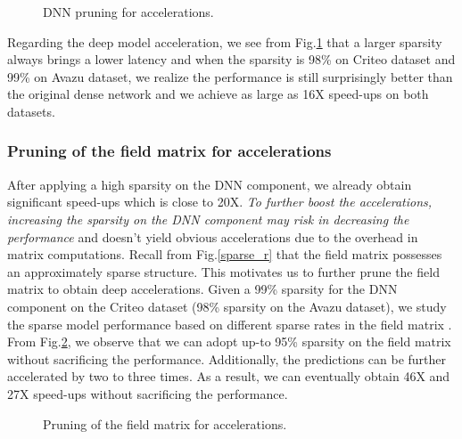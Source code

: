 \documentclass[sigconf]{acmart}
\begin{document}
\begin{figure}[h!]
\centering
\vspace{-0.1in}
  \vspace{-0.1in}
  \caption{DNN pruning for accelerations.}
  \label{prune_fig_dnns}
\end{figure}


Regarding the deep model acceleration, we see from Fig.\ref{prune_fig_dnns} that a larger sparsity always brings a lower latency and when the sparsity is 98\% on Criteo dataset and 99\% on Avazu dataset, we realize the performance is still surprisingly better than the original dense network and we achieve as large as 16X speed-ups on both datasets. 






\subsubsection{\textbf{Pruning of the field matrix }\textbf{ for accelerations}}

After applying a high sparsity on the DNN component, we already obtain significant speed-ups which is close to 20X. \emph{To further boost the accelerations, increasing the sparsity on the DNN component may risk in decreasing the performance} and doesn't yield obvious accelerations due to the overhead in matrix computations. Recall from Fig.\ref{sparse_r} that the field matrix  possesses an approximately sparse structure. This motivates us to further prune the field matrix  to obtain deep accelerations. Given a 99\% sparsity for the DNN component on the Criteo dataset (98\% sparsity on the Avazu dataset), we study the sparse model performance based on different sparse rates in the field matrix . From Fig.\ref{prune_fig_Rs}, we observe that we can adopt up-to 95\% sparsity on the field matrix  without sacrificing the performance. Additionally, the predictions can be further accelerated by two to three times. As a result, we can eventually obtain 46X and 27X speed-ups without sacrificing the performance. 

\begin{figure}[h!]
\centering
\vspace{-0.1in}
  \vspace{-0.05in}
  \caption{Pruning of the field matrix  for accelerations. }
   \label{prune_fig_Rs}
\end{figure}
\end{document}
